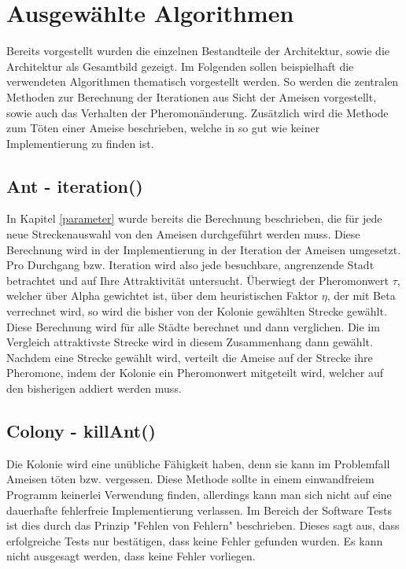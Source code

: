 \section{Ausgewählte Algorithmen}{
\label{algorithms}
	Bereits vorgestellt wurden die einzelnen Bestandteile der Architektur, sowie die Architektur als Gesamtbild gezeigt. Im Folgenden sollen beispielhaft die verwendeten Algorithmen thematisch vorgestellt werden. So werden die zentralen Methoden zur Berechnung der Iterationen aus Sicht der Ameisen vorgestellt, sowie auch das Verhalten der Pheromonänderung. Zusätzlich wird die Methode zum Töten einer Ameise beschrieben, welche in so gut wie keiner Implementierung zu finden ist.
	
	\subsection{Ant - iteration()}
	In Kapitel \ref{parameter} wurde bereits die Berechnung beschrieben, die für jede neue Streckenauswahl von den Ameisen durchgeführt werden muss. Diese Berechnung wird in der Implementierung in der Iteration der Ameisen umgesetzt. Pro Durchgang bzw. Iteration wird also jede besuchbare, angrenzende Stadt betrachtet und auf Ihre Attraktivität untersucht. Überwiegt der Pheromonwert $\tau$, welcher über Alpha gewichtet ist, über dem heuristischen Faktor $\eta$, der mit Beta verrechnet wird, so wird die bisher von der Kolonie gewählten Strecke gewählt. Diese Berechnung wird für alle Städte berechnet und dann verglichen. Die im Vergleich attraktivste Strecke wird in diesem Zusammenhang dann gewählt.
	Nachdem eine Strecke gewählt wird, verteilt die Ameise auf der Strecke ihre Pheromone, indem der Kolonie ein Pheromonwert mitgeteilt wird, welcher auf den bisherigen addiert werden muss.
	
	\subsection{Colony - killAnt()}
	Die Kolonie wird eine unübliche Fähigkeit haben, denn sie kann im Problemfall Ameisen töten bzw. vergessen.
	Diese Methode sollte in einem einwandfreiem Programm keinerlei Verwendung finden, allerdings kann man sich nicht auf eine dauerhafte fehlerfreie Implementierung verlassen. Im Bereich der Software Tests ist dies durch das Prinzip "Fehlen von Fehlern" beschrieben. Dieses sagt aus, dass erfolgreiche Tests nur bestätigen, dass keine Fehler gefunden wurden. Es kann nicht ausgesagt werden, dass keine Fehler vorliegen.
	
}
